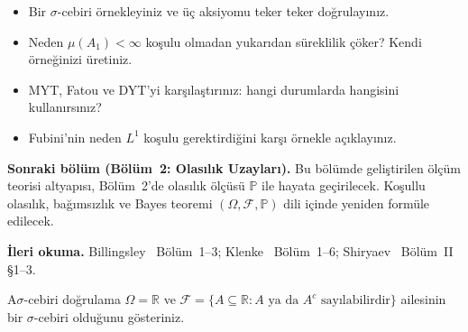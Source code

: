 \begin{ozyansima}
\begin{itemize}
  \item Bir $\sigma$-cebiri örnekleyiniz ve üç aksiyomu teker teker doğrulayınız.
  \item Neden $\mu(A_1) < \infty$ koşulu olmadan yukarıdan süreklilik çöker?
        Kendi örneğinizi üretiniz.
  \item MYT, Fatou ve DYT'yi karşılaştırınız: hangi durumlarda hangisini kullanırsınız?
  \item Fubini'nin neden $L^1$ koşulu gerektirdiğini karşı örnekle açıklayınız.
\end{itemize}
\end{ozyansima}

\begin{kopru}
\textbf{Sonraki bölüm (Bölüm~2: Olasılık Uzayları).}
Bu bölümde geliştirilen ölçüm teorisi altyapısı, Bölüm~2'de olasılık ölçüsü
$\mathbb{P}$ ile hayata geçirilecek. Koşullu olasılık, bağımsızlık ve Bayes
teoremi $(\Omega,\mathcal{F},\mathbb{P})$ dili içinde yeniden formüle edilecek.

\medskip

\textbf{İleri okuma.}
Billingsley~\cite{billingsley1995} Bölüm~1--3;
Klenke~\cite{klenke2014} Bölüm~1--6;
Shiryaev~\cite{shiryaev1996} Bölüm~II §1--3.
\end{kopru}



\cozumlualistirmalar

\begin{alistirma}[Al.1.1]{A}{$\sigma$-cebiri doğrulama}
$\Omega = \mathbb{R}$ ve $\mathcal{F} = \{A \subseteq \mathbb{R} : A \text{ ya da } A^c
\text{ sayılabilirdir}\}$ ailesinin bir $\sigma$-cebiri olduğunu gösteriniz.
\end{alistirma}

